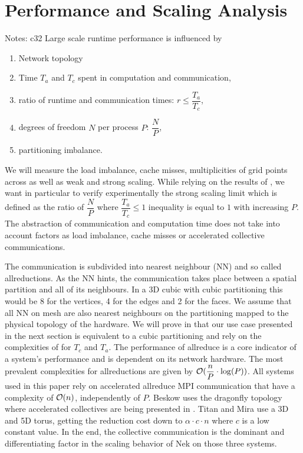 \documentclass{sig-alternate}
\begin{document}
\section{Performance and Scaling Analysis}
\label{sec:analysis}
Notes: c32
Large scale runtime performance is influenced by 
\begin{enumerate}
  \item Network topology
  \item Time $T_a$ and $T_c$ spent in computation and communication,
  \item ratio of runtime and communication times: $r \leq \dfrac{T_a}{T_c}$,
  \item degrees of freedom $N$ per process $P$: $\dfrac{N}{P}$,
  \item partitioning imbalance.
\end{enumerate}

We will measure the load imbalance, cache misses, multiplicities of grid points
across as well as weak and strong scaling.
While relying on the results of \cite{tufo:terascale}, we want in particular to verify
experimentally the strong scaling limit which is defined as the ratio of $\dfrac{N}{P}$ where
$\dfrac{T_a}{T_c}\leq 1$ inequality is equal to $1$ with increasing $P$. The
abstraction of communication and computation time does not take into account
factors as load imbalance, cache misses or accelerated collective communications.

The communication is subdivided into nearest neighbour (NN) and so called
allreductions. As the NN hints, the communication takes place between a spatial
partition and all of its neighbours. In a 3D cubic with cubic partitioning this
would be 8 for the vertices, 4 for the edges and 2 for the faces. We assume that
all NN on mesh are also nearest neighbours on the partitioning mapped to the
physical topology of the hardware. We will prove in 
that our use case presented in the next section is equivalent to a cubic
partitioning and rely on the complexities of \cite{fischer:scaling} for $T_c$ and
$T_a$. The performance of allreduce is a core indicator of a system's
performance and is dependent on its network hardware. The most prevalent
complexities for allreductions are given by $\mathcal{O}(\dfrac{n}{P}\cdot \log(P))$. All
systems used in this paper rely on accelerated allreduce MPI communication that have
a complexity of $\mathcal{O}(n)$, independently of $P$. Beskow uses the dragonfly
topology where accelerated collectives are being presented in
\cite{jain2012collectives}. Titan and Mira use a 3D and 5D torus, getting the
reduction cost down to $\alpha \cdot c \cdot n$ where $c$ is a low constant
value. In the end, the collective communication is the dominant and
differentiating factor in the scaling behavior of Nek on those three systems.
\end{document}
